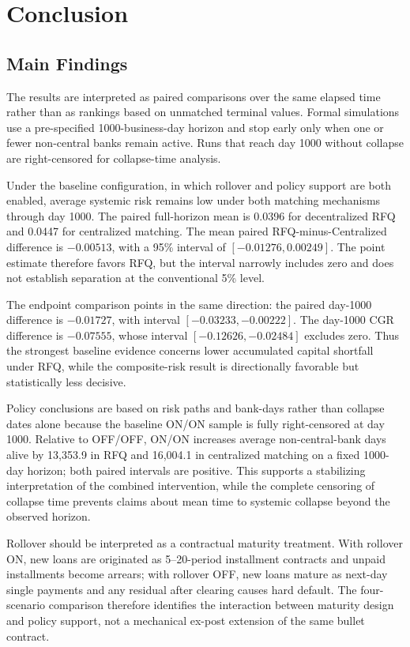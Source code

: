\chapter{Conclusion}

\section{Main Findings}

The results are interpreted as paired comparisons over the same elapsed
time rather than as rankings based on unmatched terminal values. Formal
simulations use a pre-specified 1000-business-day horizon and stop early
only when one or fewer non-central banks remain active. Runs that reach
day 1000 without collapse are right-censored for collapse-time analysis.

Under the baseline configuration, in which rollover and policy support
are both enabled, average systemic risk remains low under both matching
mechanisms through day 1000. The paired full-horizon mean is 0.0396 for
decentralized RFQ and 0.0447 for centralized matching. The mean paired
RFQ-minus-Centralized difference is \(-0.00513\), with a 95\% interval
of \([-0.01276,0.00249]\). The point estimate therefore favors RFQ, but
the interval narrowly includes zero and does not establish separation at
the conventional 5\% level.

The endpoint comparison points in the same direction: the paired
day-1000 difference is \(-0.01727\), with interval
\([-0.03233,-0.00222]\). The day-1000 CGR difference is
\(-0.07555\), whose interval \([-0.12626,-0.02484]\) excludes zero.
Thus the strongest baseline evidence concerns lower accumulated capital
shortfall under RFQ, while the composite-risk result is directionally
favorable but statistically less decisive.

Policy conclusions are based on risk paths and bank-days rather than
collapse dates alone because the baseline ON/ON sample is fully
right-censored at day 1000. Relative to OFF/OFF, ON/ON increases average
non-central-bank days alive by 13,353.9 in RFQ and 16,004.1 in centralized
matching on a fixed 1000-day horizon; both paired intervals are positive. This supports a
stabilizing interpretation of the combined intervention, while the
complete censoring of collapse time prevents claims about mean time to
systemic collapse beyond the observed horizon.

Rollover should be interpreted as a contractual maturity treatment. With
rollover ON, new loans are originated as 5--20-period installment
contracts and unpaid installments become arrears; with rollover OFF, new
loans mature as next-day single payments and any residual after clearing
causes hard default. The four-scenario comparison therefore identifies
the interaction between maturity design and policy support, not a
mechanical ex-post extension of the same bullet contract.

